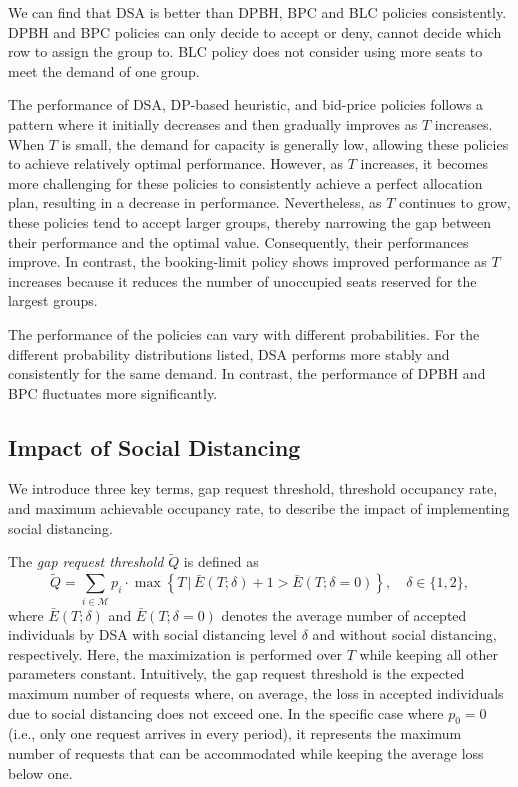 We can find that DSA is better than DPBH, BPC and BLC policies consistently. DPBH and BPC policies can only decide to accept or deny, cannot decide which row to assign the group to. BLC policy does not consider using more seats to meet the demand of one group.

The performance of DSA, DP-based heuristic, and bid-price policies follows a pattern where it initially decreases and then gradually improves as $T$ increases. When $T$ is small, the demand for capacity is generally low, allowing these policies to achieve relatively optimal performance. However, as $T$ increases, it becomes more challenging for these policies to consistently achieve a perfect allocation plan, resulting in a decrease in performance. Nevertheless, as $T$ continues to grow, these policies tend to accept larger groups, thereby narrowing the gap between their performance and the optimal value. Consequently, their performances improve. In contrast, the booking-limit policy shows improved performance as $T$ increases because it reduces the number of unoccupied seats reserved for the largest groups. 

The performance of the policies can vary with different probabilities. For the different probability distributions listed, DSA performs more stably and consistently for the same demand. In contrast, the performance of DPBH and BPC fluctuates more significantly.


\subsection{Impact of Social Distancing}\label{impact_sd}
We introduce three key terms, gap request threshold, threshold occupancy rate, and maximum achievable occupancy rate, to describe the impact of implementing social distancing.


The \textit{gap request threshold} $\tilde{Q}$ is defined as 
\[
\tilde{Q} = \sum_{i \in \mathcal{M}} p_i \cdot \max\left\{T \,\bigg|\, \bar{E}(T; \delta) + 1 > \bar{E}(T; \delta = 0)\right\}, \quad \delta \in \{1, 2\},
\]
where $\bar{E}(T; \delta)$ and $\bar{E}(T; \delta = 0)$ denotes the average number of accepted individuals by DSA with social distancing level $\delta$ and without social distancing, respectively. Here, the maximization is performed over $T$ while keeping all other parameters constant.
Intuitively, the gap request threshold is the expected maximum number of requests where, on average, the loss in accepted individuals due to social distancing does not exceed one. In the specific case where $p_0 = 0$ (i.e., only one request arrives in every period), it represents the maximum number of requests that can be accommodated while keeping the average loss below one.


